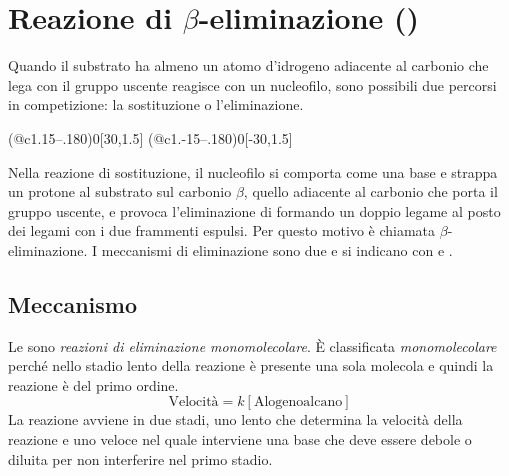 \section{Reazione di \texorpdfstring{\(\beta\)}{β}-eliminazione (\texorpdfstring{\mech[e]}{E})}
Quando il substrato ha almeno un atomo d'idrogeno adiacente al carbonio che lega con il gruppo uscente reagisce con un nucleofilo, sono possibili due percorsi in competizione: la sostituzione o l'eliminazione.

\begin{reaction}
	 \+
	\arrow(@c1.15--.180){0}[30,1.5]
	\arrow(@c1.-15--.180){0}[-30,1.5]
\end{reaction}

Nella reazione di sostituzione, il nucleofilo si comporta come una base e strappa un protone al substrato sul carbonio \(\beta\), quello adiacente al carbonio che porta il gruppo uscente, e provoca l'eliminazione di  formando un doppio legame al posto dei legami con i due frammenti espulsi. Per questo motivo è chiamata \(\beta\)-eliminazione. I meccanismi di eliminazione sono due e si indicano con \mech[e1] e \mech[e2].


\subsection{Meccanismo \texorpdfstring{\mech[e1]}{E1}}
Le \mech[e1] sono \textit{reazioni di eliminazione monomolecolare}. È classificata \textit{monomolecolare} perché nello stadio lento della reazione è presente una sola molecola e quindi la reazione è del primo ordine.
\begin{equation*}
	\text{Velocità} = k\left[\text{Alogenoalcano}\right]
\end{equation*}
La reazione avviene in due stadi, uno lento che determina la velocità della reazione e uno veloce nel quale interviene una base che deve essere debole o diluita per non interferire nel primo stadio.

